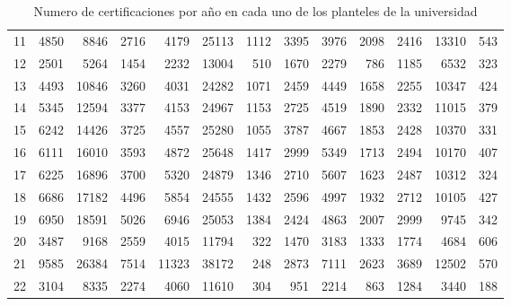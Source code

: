\documentclass[12pt]{article}
\begin{document}
\begin{table}[ht]
{\begin{tabular}{||c||rrrrrr||rrrrrr||}
  11 & 4850 & 8846 & 2716 & 4179& 25113 &  1112& 3395 & 3976 & 2098 & 2416 &13310  &  543\\
  12 & 2501 & 5264 & 1454 & 2232& 13004  &  510& 1670 & 2279 &  786 & 1185 & 6532  &  323\\
  13 & 4493 &10846 & 3260 & 4031& 24282  & 1071& 2459 & 4449 & 1658 & 2255 &10347  &  424\\
  14 & 5345 &12594 & 3377 & 4153& 24967  & 1153& 2725 & 4519 & 1890 & 2332 &11015  &  379\\
  15 & 6242 &14426 & 3725 & 4557& 25280  & 1055& 3787 & 4667 & 1853 & 2428 &10370  &  331\\
  16 & 6111 &16010 & 3593 & 4872& 25648  & 1417& 2999 & 5349 & 1713 & 2494 &10170  &  407\\
  17 & 6225 &16896 & 3700 & 5320& 24879  & 1346& 2710 & 5607 & 1623 & 2487 &10312  &  324\\
  18 & 6686 &17182 & 4496 & 5854& 24555  & 1432& 2596 & 4997 & 1932 & 2712 &10105  &  427\\
  19 & 6950 &18591 & 5026 & 6946& 25053  & 1384& 2424 & 4863 & 2007 & 2999 & 9745  &  342\\
  20 & 3487 & 9168 & 2559 & 4015& 11794  &  322& 1470 & 3183 & 1333 & 1774 & 4684  &  606\\
  21 & 9585 &26384 & 7514 &11323& 38172  &  248& 2873 & 7111 & 2623 & 3689 &12502  &  570\\
  22 & 3104 & 8335 & 2274 & 4060& 11610  &  304&  951 & 2214 &  863 & 1284 & 3440  &  188\\\hline\hline
\end{tabular}}
\caption{Numero de certificaciones por a\~no en cada uno de los planteles de la universidad}
\label{Tabla_Certificaciones_Plantel_Anho}
\end{table}



\newpage
\end{document}
